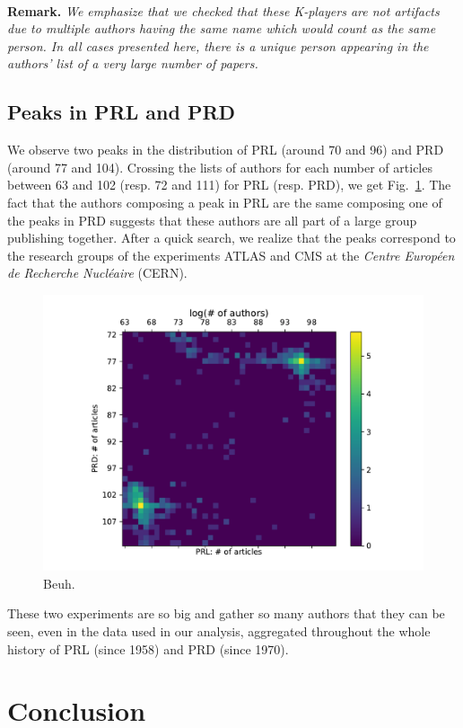 \documentclass[aps,prl,floatfix,twocolumn]{revtex4-1}
\begin{document}
\paragraph{}
{\bf Remark.}\textit{
We emphasize that we checked that these K-players are not artifacts due to multiple authors having the same name which would count as the same person. 
In all cases presented here, there is a unique person appearing in the authors' list of a very large number of papers. 
}

\subsection{Peaks in PRL and PRD}
We observe two peaks in the distribution of PRL (around 70 and 96) and PRD (around 77 and 104). 
Crossing the lists of authors for each number of articles between 63 and 102 (resp. 72 and 111) for PRL (resp. PRD), we get Fig.~\ref{fig:prl_prd}. 
The fact that the authors composing a peak in PRL are the same composing one of the peaks in PRD suggests that these authors are all part of a large group publishing together. 
After a quick search, we realize that the peaks correspond to the research groups of the experiments ATLAS and CMS at the  \emph{Centre Europ\'een de Recherche Nucl\'eaire} (CERN). 
\begin{figure}
 \centering
 \includegraphics[width=.8\columnwidth]{../figures/prl_prd_log.pdf}
 \caption{Beuh.}
 \label{fig:prl_prd}
\end{figure}
These two experiments are so big and gather so many authors that they can be seen, even in the data used in our analysis, aggregated throughout the whole history of PRL (since 1958) and PRD (since 1970). 

\section{Conclusion}




\end{document}
